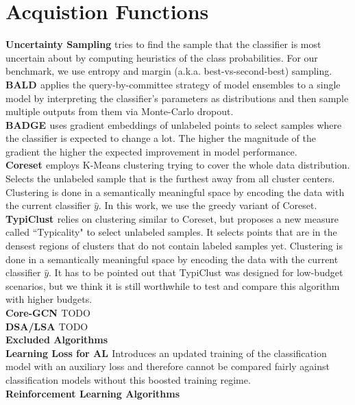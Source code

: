 \documentclass[]{article}
\begin{document}
\section{Acquistion Functions}\label{app:acquisition_functions}
\textbf{Uncertainty Sampling} 
tries to find the sample that the classifier is most uncertain about by computing heuristics of the class probabilities. For our benchmark, we use entropy and margin (a.k.a. best-vs-second-best) sampling.\\
\textbf{BALD \cite{kirsch2019batchbald}}
applies the query-by-committee strategy of model ensembles to a single model by interpreting the classifier's parameters as distributions and then sample multiple outputs from them via Monte-Carlo dropout.\\
\textbf{BADGE \cite{ashdeep}} uses gradient embeddings of unlabeled points to select samples where the classifier is expected to change a lot. The higher the magnitude of the gradient the higher the expected improvement in model performance.\\
\textbf{Coreset \cite{sener2017active}}
employs K-Means clustering trying to cover the whole data distribution.
Selects the unlabeled sample that is the furthest away from all cluster centers.
Clustering is done in a semantically meaningful space by encoding the data with the current classifier $\hat y$.
In this work, we use the greedy variant of Coreset.\\
\textbf{TypiClust \cite{hacohen2022active}}
relies on clustering similar to Coreset, but proposes a new measure called ``Typicality" to select unlabeled samples.
It selects points that are in the densest regions of clusters that do not contain labeled samples yet.
Clustering is done in a semantically meaningful space by encoding the data with the current classifier $\hat y$.
It has to be pointed out that TypiClust was designed for low-budget scenarios, but we think it is still worthwhile to test and compare this algorithm with higher budgets. \\
\textbf{Core-GCN \cite{caramalau2021sequential}} TODO \\
\textbf{DSA/LSA \cite{kim2019guiding}} TODO \\ [2mm]
%
\textbf{Excluded Algorithms}\\
\textbf{Learning Loss for AL \cite{yoo2019learning}}
Introduces an updated training of the classification model with an auxiliary loss and therefore cannot be compared fairly against classification models without this boosted training regime.\\ [1mm]
%
\textbf{Reinforcement Learning Algorithms} \\
\end{document}
